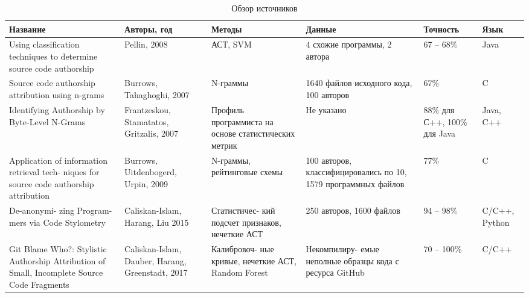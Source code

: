 \begin{table}[h!]
\caption{ Обзор источников }
\label{tab:results}
\begin{center}
\begin{tabularx}{\linewidth}{|X|X|X|X|X|X|}
\hline
Название & Авторы, год & Методы & Данные & Точность & Язык\\
\hline
Using classification techniques to determine source code authorship~\cite{pellin} & Pellin, 2008 & АСТ, SVM & 4 схожие программы, 2 автора & 67 -- 68\% & Java\\
\hline
Source code authorship attribution using n-grams~\cite{burrows} & Burrows, Tahaghoghi, 2007 & N-граммы & 1640 файлов исходного кода, 100 авторов & 67\% & C\\
\hline
Identifying Authorship by Byte-Level N-Grams~\cite{frantz_2} & Frantzeskou, Stamatatos, Gritzalis, 2007 & Профиль программиста на основе статистических метрик & Не указано & 88\% для С++, 100\% для Java & Java, C++\\
\hline
Application of information retrieval tech- niques for source code authorship attribution~\cite{burrows_3} & Burrows, Uitdenbogerd, Urpin, 2009 & N-граммы, рейтинговые схемы & 100 авторов, классифицировались по 10, 1579 программных файлов & 77\% & C\\
\hline
De-anonymi- zing Program- mers via Code Stylometry~\cite{caliskan} & Caliskan-Islam, Harang, Liu 2015 & Статистичес- кий подсчет признаков, нечеткие АСТ & 250 авторов, 1600 файлов & 94 -- 98\% & C/C++, Python \\
\hline
Git Blame Who?: Stylistic Authorship Attribution of Small, Incomplete Source Code Fragments~\cite{git_blame} & Caliskan-Islam, Dauber, Harang, Greenstadt, 2017 & Калибровоч- ные кривые, нечеткие АСТ, Random Forest & Некомпилиру- емые неполные образцы кода с ресурса GitHub & 70 -- 100\% & C/C++\\
\hline
\end{tabularx}
\end{center}
\end{table}